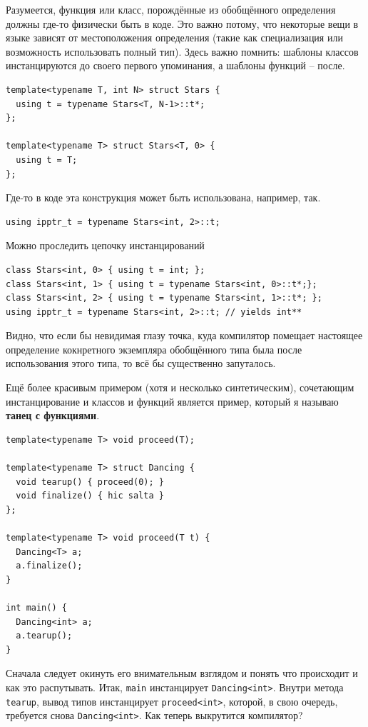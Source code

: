 \documentclass[a4paper,12pt,oneside]{book}
\begin{document}
Разумеется, функция или класс, порождённые из обобщённого определения должны где-то физически быть в коде. Это важно потому, что некоторые вещи в языке зависят от местоположения определения (такие как специализация или возможность использовать полный тип). Здесь важно помнить: шаблоны классов инстанцируются до своего первого упоминания, а шаблоны функций -- после.

\begin{lstlisting}
template<typename T, int N> struct Stars {
  using t = typename Stars<T, N-1>::t*;
};

template<typename T> struct Stars<T, 0> {
  using t = T;
};
\end{lstlisting}

Где-то в коде эта конструкция может быть использована, например, так.

\begin{lstlisting}
using ipptr_t = typename Stars<int, 2>::t;
\end{lstlisting}

Можно проследить цепочку инстанцирований

\begin{lstlisting}
class Stars<int, 0> { using t = int; };
class Stars<int, 1> { using t = typename Stars<int, 0>::t*;}; 
class Stars<int, 2> { using t = typename Stars<int, 1>::t*; };
using ipptr_t = typename Stars<int, 2>::t; // yields int**
\end{lstlisting}

Видно, что если бы невидимая глазу точка, куда компилятор помещает настоящее определение кокнретного экземпляра обобщённого типа была после использования этого типа, то всё бы существенно запуталось.

Ещё более красивым примером (хотя и несколько синтетическим), сочетающим инстанцирование и классов и функций является пример, который я называю \textbf{танец с функциями}.

\begin{lstlisting}
template<typename T> void proceed(T);

template<typename T> struct Dancing {
  void tearup() { proceed(0); }
  void finalize() { hic salta }
};

template<typename T> void proceed(T t) {
  Dancing<T> a;
  a.finalize();
}

int main() {
  Dancing<int> a;
  a.tearup();
}
\end{lstlisting}

Сначала следует окинуть его внимательным взглядом и понять что происходит и как это распутывать. Итак, \lstinline!main! инстанцирует \lstinline!Dancing<int>!. Внутри метода \lstinline!tearup!, вывод типов инстанцирует \lstinline!proceed<int>!, которой, в свою очередь, требуется снова \lstinline!Dancing<int>!. Как теперь выкрутится компилятор?
\end{document}
